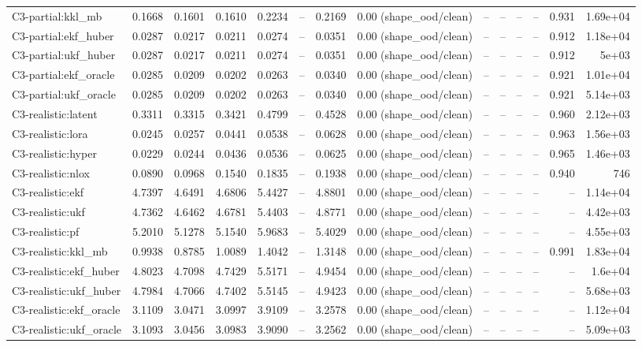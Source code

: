 \begin{table}[t]
\begin{tabular}{lrrrrrrrrrrrrr}
C3-partial:kkl\_mb & 0.1668 & 0.1601 & 0.1610 & 0.2234 & – & 0.2169 & 0.00 (shape\_ood/clean) & – & – & – & – & 0.931 & 1.69e+04 \\
C3-partial:ekf\_huber & 0.0287 & 0.0217 & 0.0211 & 0.0274 & – & 0.0351 & 0.00 (shape\_ood/clean) & – & – & – & – & 0.912 & 1.18e+04 \\
C3-partial:ukf\_huber & 0.0287 & 0.0217 & 0.0211 & 0.0274 & – & 0.0351 & 0.00 (shape\_ood/clean) & – & – & – & – & 0.912 & 5e+03 \\
C3-partial:ekf\_oracle & 0.0285 & 0.0209 & 0.0202 & 0.0263 & – & 0.0340 & 0.00 (shape\_ood/clean) & – & – & – & – & 0.921 & 1.01e+04 \\
C3-partial:ukf\_oracle & 0.0285 & 0.0209 & 0.0202 & 0.0263 & – & 0.0340 & 0.00 (shape\_ood/clean) & – & – & – & – & 0.921 & 5.14e+03 \\
C3-realistic:latent & 0.3311 & 0.3315 & 0.3421 & 0.4799 & – & 0.4528 & 0.00 (shape\_ood/clean) & – & – & – & – & 0.960 & 2.12e+03 \\
C3-realistic:lora & 0.0245 & 0.0257 & 0.0441 & 0.0538 & – & 0.0628 & 0.00 (shape\_ood/clean) & – & – & – & – & 0.963 & 1.56e+03 \\
C3-realistic:hyper & 0.0229 & 0.0244 & 0.0436 & 0.0536 & – & 0.0625 & 0.00 (shape\_ood/clean) & – & – & – & – & 0.965 & 1.46e+03 \\
C3-realistic:nlox & 0.0890 & 0.0968 & 0.1540 & 0.1835 & – & 0.1938 & 0.00 (shape\_ood/clean) & – & – & – & – & 0.940 & 746 \\
C3-realistic:ekf & 4.7397 & 4.6491 & 4.6806 & 5.4427 & – & 4.8801 & 0.00 (shape\_ood/clean) & – & – & – & – & – & 1.14e+04 \\
C3-realistic:ukf & 4.7362 & 4.6462 & 4.6781 & 5.4403 & – & 4.8771 & 0.00 (shape\_ood/clean) & – & – & – & – & – & 4.42e+03 \\
C3-realistic:pf & 5.2010 & 5.1278 & 5.1540 & 5.9683 & – & 5.4029 & 0.00 (shape\_ood/clean) & – & – & – & – & – & 4.55e+03 \\
C3-realistic:kkl\_mb & 0.9938 & 0.8785 & 1.0089 & 1.4042 & – & 1.3148 & 0.00 (shape\_ood/clean) & – & – & – & – & 0.991 & 1.83e+04 \\
C3-realistic:ekf\_huber & 4.8023 & 4.7098 & 4.7429 & 5.5171 & – & 4.9454 & 0.00 (shape\_ood/clean) & – & – & – & – & – & 1.6e+04 \\
C3-realistic:ukf\_huber & 4.7984 & 4.7066 & 4.7402 & 5.5145 & – & 4.9423 & 0.00 (shape\_ood/clean) & – & – & – & – & – & 5.68e+03 \\
C3-realistic:ekf\_oracle & 3.1109 & 3.0471 & 3.0997 & 3.9109 & – & 3.2578 & 0.00 (shape\_ood/clean) & – & – & – & – & – & 1.12e+04 \\
C3-realistic:ukf\_oracle & 3.1093 & 3.0456 & 3.0983 & 3.9090 & – & 3.2562 & 0.00 (shape\_ood/clean) & – & – & – & – & – & 5.09e+03 \\
\bottomrule
\end{tabular}
\end{table}

